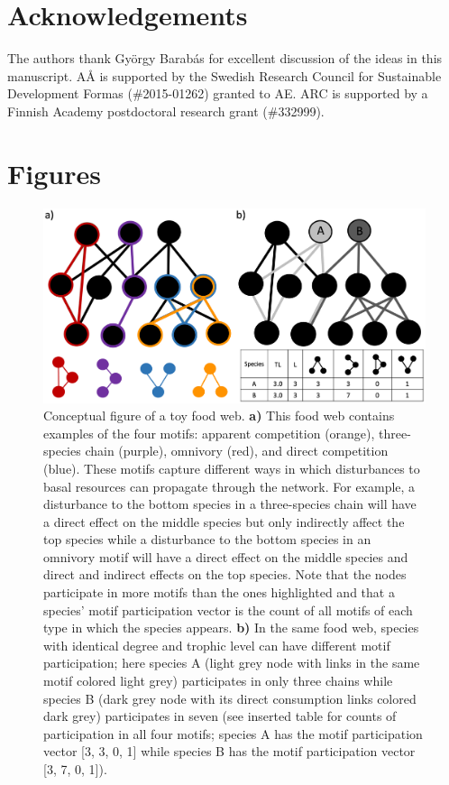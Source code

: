\documentclass[12pt]{article}
\begin{document}
\begin{spacing}{2.0}
\section*{Acknowledgements}

    The authors thank Gy\"{o}rgy Barab\'{a}s for excellent discussion of the ideas in this manuscript. A{\AA} is supported by the Swedish Research Council for Sustainable Development Formas (\#2015-01262) granted to AE. ARC is supported by a Finnish Academy postdoctoral research grant (\#332999).

\clearpage    

\section*{Figures}
    

        \begin{figure}[hb!]
        \centering
        \includegraphics[width=.9\textwidth]{figures/Figure_1.eps}
        \caption{Conceptual figure of a toy food web. \textbf{a)} This food web contains examples of the four motifs: apparent competition (orange), three-species chain (purple), omnivory (red), and direct competition (blue). These motifs capture different ways in which disturbances to basal resources can propagate through the network. For example, a disturbance to the bottom species in a three-species chain will have a direct effect on the middle species but only indirectly affect the top species while a disturbance to the bottom species in an omnivory motif will have a direct effect on the middle species and direct and indirect effects on the top species. 
        Note that the nodes participate in more motifs than the ones highlighted and that a species' motif participation vector is the count of all motifs of each type in which the species appears. \textbf{b)} In the same food web, species with identical degree and trophic level can have different motif participation; here species A (light grey node with links in the same motif colored light grey) participates in only three chains while species B (dark grey node with its direct consumption links colored dark grey) participates in seven (see inserted table for counts of participation in all four motifs; species A has the motif participation vector [3, 3, 0, 1] while species B has the motif participation vector [3, 7, 0, 1]).
}
\end{figure}
\end{spacing}
\end{document}
